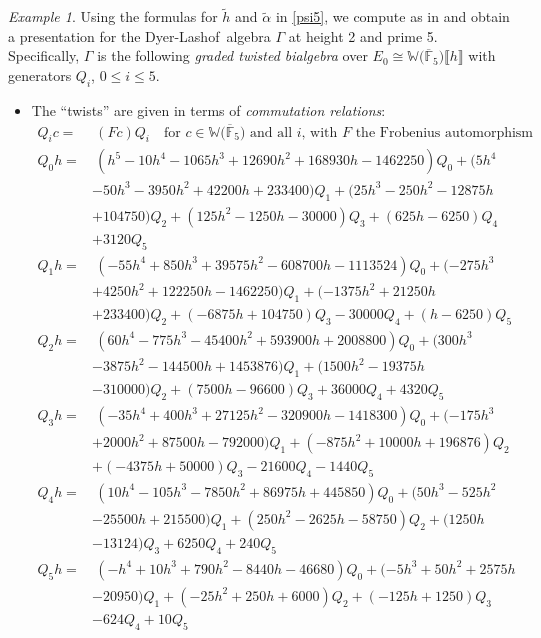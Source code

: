 \documentclass{gtpart}
\theoremstyle{definition}
\theoremstyle{remark}
\newtheorem{ex}[thm]{Example}
\newcommand{\mb}[1]{\mathbb{#1}}
\newcommand{\cF}{\overline {\mb F}}
\newcommand{\DL}{Dyer-Lashof~}
\newcommand{\BW}{{\mb W}}
\newcommand{\A}{\alpha}
\newcommand{\G}{\Gamma}
\newcommand{\lb}{\llbracket}
\newcommand{\rb}{\rrbracket}
\renewcommand{\=}{\approx}
\renewcommand{\-}{\sim}
\numberwithin{equation}{section}
\numberwithin{thm}{section}
\begin{document}
\begin{ex}
 \label{ex:gamma}
 Using the formulas for $\widetilde{h}$ and $\widetilde{\A}$ in \eqref{psi5}, 
 we compute as in \cite[Proposition 3.6]{p3} and obtain a presentation for the \DL algebra $\G$ at height 2 and prime 5.  
 Specifically, $\G$ is the following {\em graded twisted bialgebra} 
 over $E_0 \cong \BW \big( \cF_5 \big) \lb h \rb$ with generators $Q_i$, $0 \leq i \leq 5$.  

 \begin{itemize}
  \item The ``twists'' are given in terms of {\em commutation relations}: 
  \begin{equation*}
   \begin{split}
    Q_i c = & ~ (F c) Q_i \quad \text{for $c \in \BW \big( \cF_5 \big)$ and all $i$, with $F$ the Frobenius automorphism} \\
    Q_0 h = & ~ (h^5-10 h^4-1065 h^3+12690 h^2+168930 h-1462250) Q_0+(5 h^4 \\
            & -50 h^3-3950 h^2 +42200 h+233400) Q_1+(25 h^3-250 h^2-12875 h \\
            & +104750) Q_2+(125 h^2-1250 h -30000) Q_3+(625 h-6250) Q_4 \\
            & +3120 Q_5 \\
    Q_1 h = & ~ (-55 h^4+850 h^3+39575 h^2-608700 h-1113524) Q_0+(-275 h^3 \\
            & +4250 h^2+122250 h -1462250) Q_1+(-1375 h^2+21250 h \\
            & +233400) Q_2+(-6875 h+104750) Q_3-30000 Q_4 +(h-6250) Q_5 \\
    Q_2 h = & ~ (60 h^4-775 h^3-45400 h^2+593900 h+2008800) Q_0+(300 h^3 \\
            & -3875 h^2-144500 h +1453876) Q_1+(1500 h^2-19375 h \\
            & -310000) Q_2+(7500 h-96600) Q_3+36000 Q_4 +4320 Q_5 \\
    Q_3 h = & ~ (-35 h^4+400 h^3+27125 h^2-320900 h-1418300) Q_0+(-175 h^3 \\
            & +2000 h^2+87500 h -792000) Q_1+(-875 h^2+10000 h+196876) Q_2 \\
            & +(-4375 h+50000) Q_3-21600 Q_4 -1440 Q_5 \\
    Q_4 h = & ~ (10 h^4-105 h^3-7850 h^2+86975 h+445850) Q_0+(50 h^3-525 h^2 \\
            & -25500 h +215500) Q_1+(250 h^2-2625 h-58750) Q_2+(1250 h \\
            & -13124) Q_3+6250 Q_4+240 Q_5 \\
    Q_5 h = & ~ (-h^4+10 h^3+790 h^2-8440 h-46680) Q_0+(-5 h^3+50 h^2+2575 h \\
            & -20950) Q_1 +(-25 h^2+250 h+6000) Q_2+(-125 h+1250) Q_3 \\
            & -624 Q_4+10 Q_5 
   \end{split}
  \end{equation*}


\end{itemize}
\end{ex}
\end{document}
